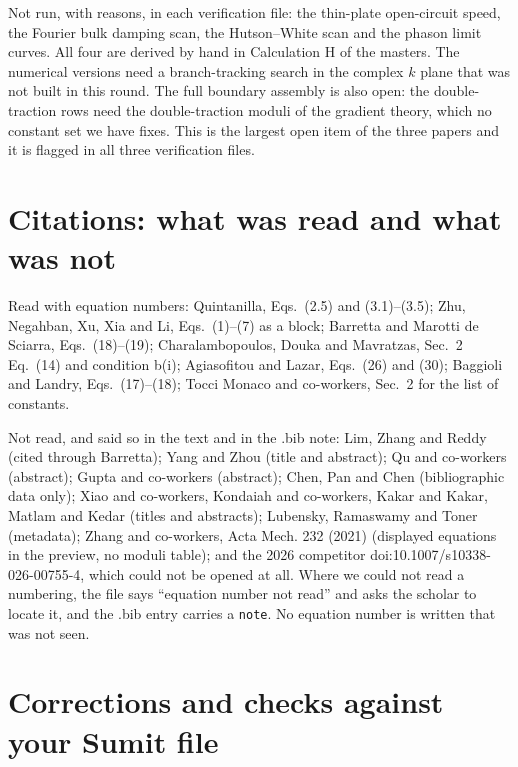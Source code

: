 \documentclass[11pt,a4paper]{article}
\begin{document}
\noindent Not run, with reasons, in each verification file: the thin-plate open-circuit speed, the Fourier
bulk damping scan, the Hutson--White scan and the phason limit curves. All four are derived by hand in
Calculation H of the masters. The numerical versions need a branch-tracking search in the complex $k$ plane
that was not built in this round. The full boundary assembly is also open: the double-traction rows need the
double-traction moduli of the gradient theory, which no constant set we have fixes. This is the largest open
item of the three papers and it is flagged in all three verification files.

\section*{Citations: what was read and what was not}

Read with equation numbers: Quintanilla, Eqs.~(2.5) and (3.1)--(3.5); Zhu, Negahban, Xu, Xia and Li,
Eqs.~(1)--(7) as a block; Barretta and Marotti de Sciarra, Eqs.~(18)--(19); Charalambopoulos, Douka and
Mavratzas, Sec.~2 Eq.~(14) and condition b(i); Agiasofitou and Lazar, Eqs.~(26) and (30); Baggioli and
Landry, Eqs.~(17)--(18); Tocci Monaco and co-workers, Sec.~2 for the list of constants.

Not read, and said so in the text and in the .bib note: Lim, Zhang and Reddy (cited through Barretta);
Yang and Zhou (title and abstract); Qu and co-workers (abstract); Gupta and co-workers (abstract); Chen, Pan
and Chen (bibliographic data only); Xiao and co-workers, Kondaiah and co-workers, Kakar and Kakar, Matlam
and Kedar (titles and abstracts); Lubensky, Ramaswamy and Toner (metadata); Zhang and co-workers, Acta Mech.
232 (2021) (displayed equations in the preview, no moduli table); and the 2026 competitor
doi:10.1007/s10338-026-00755-4, which could not be opened at all. Where we could not read a numbering, the
file says ``equation number not read'' and asks the scholar to locate it, and the .bib entry carries a
\texttt{note}. No equation number is written that was not seen.

\section*{Corrections and checks against your Sumit file}
\end{document}
